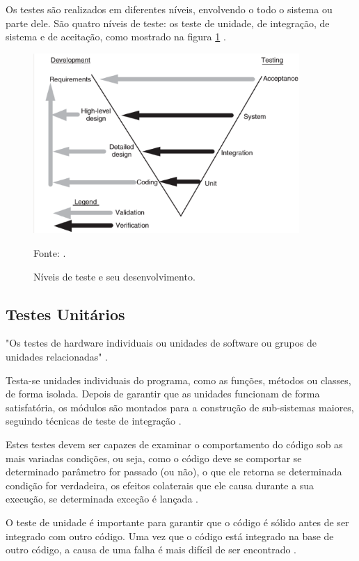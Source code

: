 Os testes são realizados em diferentes níveis, envolvendo o todo o sistema ou parte dele. São quatro níveis de teste: os teste de unidade, de integração, de sistema e de aceitação, como mostrado na figura \ref{nivelTeste} \cite[pág.~18]{naik2008}.

\begin{figure}[H]
\centering
\includegraphics[width=0.9\textwidth]{figuras/nivelTeste}
\caption{Níveis de teste e seu desenvolvimento.}{Fonte: .} 
\label{nivelTeste}
\end{figure}

\subsection{Testes Unitários}

"Os testes de hardware individuais ou unidades de software ou grupos de unidades relacionadas" \cite{ieee}.

Testa-se unidades individuais do programa, como as funções, métodos ou classes, de forma isolada. Depois de garantir que as unidades funcionam de forma satisfatória, os módulos são montados para a construção de sub-sistemas maiores, seguindo técnicas de teste de integração \cite[pág.~18]{naik2008}.

Estes testes devem ser capazes de examinar o comportamento do código sob as mais variadas condições, ou seja, como o código deve se comportar se determinado parâmetro for passado (ou não), o que ele retorna se determinada condição for verdadeira, os efeitos colaterais que ele causa durante a sua execução, se determinada exceção é lançada \cite{thiago2001}.

O teste de unidade é importante para garantir que o código é sólido antes de ser integrado com outro código. Uma vez que o código está integrado na base de outro código, a causa de uma falha é mais difícil de ser encontrado \cite{williams2006}.

